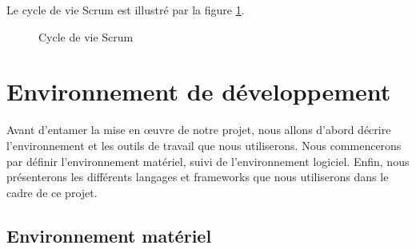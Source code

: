 Le cycle de vie Scrum est illustré par la figure \ref{fig:cycle_de_vie_scrum}.

\begin{figure}[!h]
  \centering
  \caption{Cycle de vie Scrum}
  \label{fig:cycle_de_vie_scrum}
\end{figure}

\section{Environnement de développement}
Avant d'entamer la mise en œuvre de notre projet, nous allons d'abord décrire l'environnement et les outils de travail que nous utiliserons. Nous commencerons par définir l'environnement matériel, suivi de l'environnement logiciel. Enfin, nous présenterons les différents langages et frameworks que nous utiliserons dans le cadre de ce projet.

\subsection{Environnement matériel}

